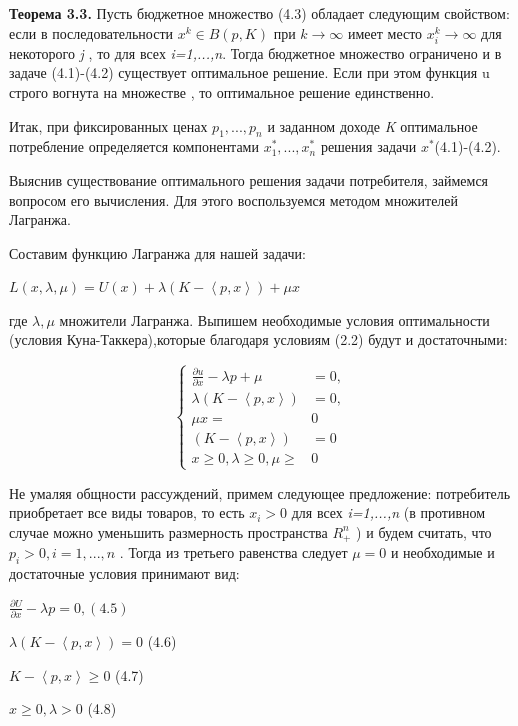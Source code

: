 \documentclass[12pt, 4paper]{book}
\begin{document}
{\textbf{Теорема 3.3.} Пусть бюджетное множество (4.3) обладает следующим свойством: если в последовательности $x^{k} \in B(p,K)$ при $k \rightarrow \infty$ имеет место $x_{i}^{k} \rightarrow \infty $ для некоторого \textit{j} , то  для всех \textit{i=1,...,n}. Тогда бюджетное множество ограничено и в задаче (4.1)-(4.2) существует оптимальное решение. Если при этом функция u строго вогнута на множестве  , то оптимальное решение единственно.
\par

Итак, при фиксированных ценах $p_1,...,p_n$ и заданном доходе \textit{K} оптимальное потребление определяется компонентами $x_{1}^{*},...,x_{n}^{*}$ решения  задачи $x^{*}$(4.1)-(4.2).
\par

Выяснив существование оптимального решения задачи потребителя, займемся вопросом его вычисления. Для этого воспользуемся методом множителей Лагранжа.
\par

Составим функцию Лагранжа для нашей задачи: 
\begin{center}
$L(x,\lambda , \mu )= U(x) + \lambda (K- \left\langle p,x \right\rangle)+\mu x$
\end{center}
\par
где $\lambda , \mu $ множители Лагранжа. Выпишем необходимые условия оптимальности (условия Куна-Таккера),которые благодаря условиям (2.2) будут и достаточными: 
\begin{center}
$$\left\{
\begin{aligned}
\frac{\partial u}{\partial x} - \lambda p + \mu & = 0,\\
\lambda (K- \left\langle  p, x \right\rangle) & = 0,\\
\mu x = & 0\\
(K- \left\langle  p, x \right\rangle) & = 0 \\
x \geq 0,\lambda \geq 0,\mu \geq & 0
\end{aligned}
\right.$$
\end{center}
\par

Не умаляя общности рассуждений, примем следующее предложение: потребитель приобретает все виды товаров, то есть $x_i>0$ для всех \textit{i=1,...,n }(в противном случае можно уменьшить размерность пространства $R_{+}^{n}$ ) и будем считать, что $p_i>0,i=1,...,n$ . Тогда из третьего равенства следует $\mu =0$ и необходимые и достаточные условия принимают вид: 
\begin{center}
$\frac{\partial U}{\partial x } - \lambda p =0, (4.5)$
\end{center}
\begin{center}
$\lambda(K - \left\langle p,x\right\rangle)=0$ (4.6)
\end{center}
\begin{center}
$K - \left\langle p,x\right\rangle \geq 0$ (4.7)
\end{center}
\begin{center}
$x \geq 0, \lambda > 0$ (4.8)
\end{center}
\par

}
\end{document}
